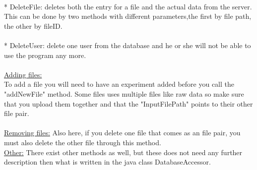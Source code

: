 \\
* DeleteFile: deletes both the entry for a file and the actual data from the server. This can be done by two methods with different parameters,the first by file path, the other by fileID.\\
\\
* DeleteUser: delete one user from the database and he or she will not be able to use the program any more.\\
\\
\underline{Adding files:}\\
To add a file you will need to have an experiment added before you call the "addNewFile" method. Some files uses multiple files like raw data so make sure that you upload them together and that the "InputFilePath" points to their other file pair.\\
\\
\underline{Removing files:} Also here, if you delete one file that comes as an file pair, you must also delete the other file through this method.\\

\underline{Other:} There exist other methods as well, but these does not need any further description then what is written in the java class DatabaseAccessor.\\